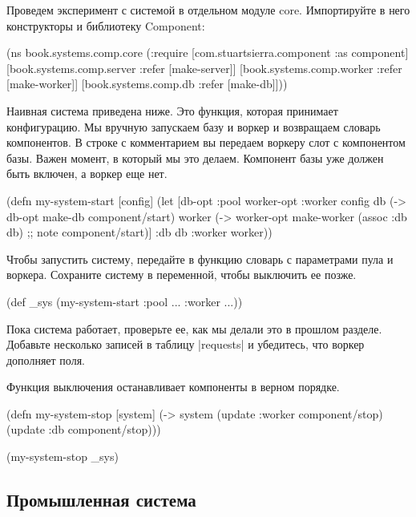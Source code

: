 Проведем эксперимент с системой в отдельном модуле core. Импортируйте в него
конструкторы и библиотеку Component:

\begin{code}
(ns book.systems.comp.core
  (:require
   [com.stuartsierra.component :as component]
   [book.systems.comp.server :refer [make-server]]
   [book.systems.comp.worker :refer [make-worker]]
   [book.systems.comp.db :refer [make-db]]))
\end{code}

Наивная система приведена ниже. Это функция, которая принимает конфигурацию. Мы
вручную запускаем базу и воркер и возвращаем словарь компонентов. В строке с
комментарием вы передаем воркеру слот с компонентом базы. Важен момент, в
который мы это делаем. Компонент базы уже должен быть включен, а воркер еще нет.

\begin{code}
(defn my-system-start
  [config]
  (let [{db-opt :pool
         worker-opt :worker} config
        db (-> db-opt
               make-db
               component/start)
        worker (-> worker-opt
                   make-worker
                   (assoc :db db) ;; note
                   component/start)]
    {:db db :worker worker}))
\end{code}

Чтобы запустить систему, передайте в функцию словарь с параметрами пула и
воркера. Сохраните систему в переменной, чтобы выключить ее позже.

\begin{code}
(def _sys (my-system-start {:pool {...} :worker {...}}))
\end{code}

Пока система работает, проверьте ее, как мы делали это в прошлом
разделе. Добавьте несколько записей в таблицу \spverb|requests| и убедитесь, что воркер
дополняет поля.

Функция выключения останавливает компоненты в верном порядке.

\begin{code}
(defn my-system-stop
  [system]
  (-> system
      (update :worker component/stop)
      (update :db component/stop)))

(my-system-stop _sys)
\end{code}

\subsection{Промышленная система}

